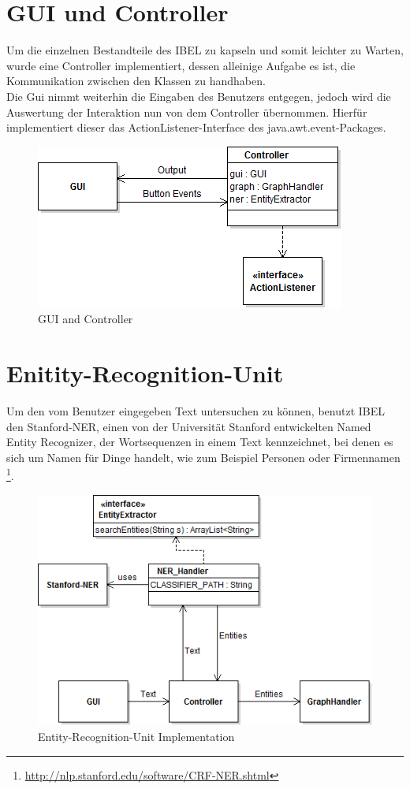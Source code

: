 \documentclass[11pt, a4paper, oneside]{Thesis} %
\begin{document}
\section{GUI und Controller}
Um die einzelnen Bestandteile des IBEL zu kapseln und somit leichter zu Warten, wurde eine Controller implementiert, dessen alleinige Aufgabe es ist, die Kommunikation zwischen den Klassen zu handhaben. \\
Die Gui nimmt weiterhin die Eingaben des Benutzers entgegen, jedoch wird die Auswertung der Interaktion nun von dem Controller \"ubernommen. Hierf\"ur implementiert dieser das ActionListener-Interface des java.awt.event-Packages.
\begin{figure}[ht!]
\centering
\includegraphics[scale=0.55]{./guiCont.png}
\caption[GUI and Controller]{GUI and Controller}
\end{figure}

\section{Enitity-Recognition-Unit}
\label{Kapitel 3.2}
Um den vom Benutzer eingegeben Text untersuchen zu k\"onnen, benutzt IBEL den Stanford-NER, einen von der Universit\"at Stanford entwickelten Named Entity Recognizer, der Wortsequenzen in einem Text kennzeichnet, bei denen es sich um Namen f\"ur Dinge handelt, wie zum Beispiel Personen oder Firmennamen \footnote{\url{http://nlp.stanford.edu/software/CRF-NER.shtml}}. 
\begin{figure}[ht!]
\centering
\includegraphics[scale=0.55]{./eruImp.png}
\caption[Entity-Recognition-Unit Impl.]{Entity-Recognition-Unit Implementation}
\end{figure}
\end{document}
